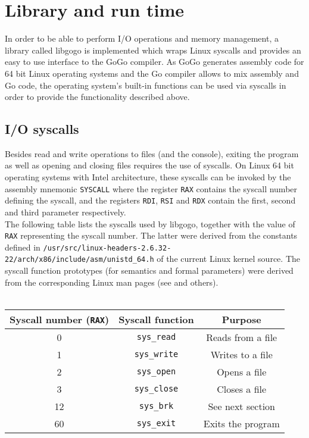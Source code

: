 \documentclass[a4paper]{scrreprt}
\begin{document}
  \chapter{Library and run time}
    In order to be able to perform I/O operations and memory management, a library called libgogo is implemented which wraps Linux syscalls and provides an easy to use interface to the GoGo compiler. As GoGo generates assembly code for 64 bit Linux operating systems and the Go compiler allows to mix assembly and Go code, the operating system's built-in functions can be used via syscalls in order to provide the functionality described above.

    \section{I/O syscalls}
      Besides read and write operations to files (and the console), exiting the program as well as opening and closing files requires the use of syscalls. On Linux 64 bit operating systems with Intel architecture, these syscalls can be invoked by the assembly mnemonic \texttt{SYSCALL} where the register \texttt{RAX} contains the syscall number defining the syscall, and the registers \texttt{RDI}, \texttt{RSI} and \texttt{RDX} contain the first, second and third parameter respectively\cite{var08}.\\
      The following table lists the syscalls used by libgogo, together with the value of \texttt{RAX} representing the syscall number. The latter were derived from the constants defined in \texttt{/usr/src/linux-headers-2.6.32-22/arch/x86/include/asm/unistd\_64.h} of the current Linux kernel source\cite{var10}. The syscall function prototypes (for semantics and formal parameters) were derived from the corresponding Linux man pages (see \cite{var97} and others).\\ \\
      \begin{tabular}{|c|c|c|}
        \hline
        \textbf{Syscall number (\texttt{RAX})} & \textbf{Syscall function} & \textbf{Purpose}\\ \hline
        0 & \texttt{sys\_read} & Reads from a file\\ \hline
        1 & \texttt{sys\_write} & Writes to a file\\ \hline
        2 & \texttt{sys\_open} & Opens a file\\ \hline
        3 & \texttt{sys\_close} & Closes a file\\ \hline
        12 & \texttt{sys\_brk} & See next section\\ \hline
        60 & \texttt{sys\_exit} & Exits the program\\ \hline
      \end{tabular}
\end{document}
